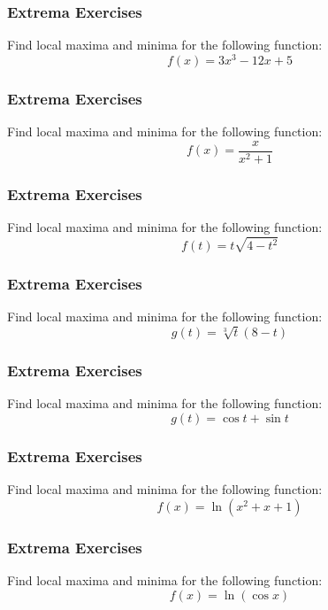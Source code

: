\documentclass[xcolor=dvipsnames]{beamer}
\begin{document}
\begin{frame}
  \frametitle{Extrema Exercises}
{\ubung} Find local maxima and minima for the following function:
\begin{equation}
  \label{eq:xxyxx1}
f(x)=3x^{3}-12x+5
\end{equation}
\end{frame}

\begin{frame}
  \frametitle{Extrema Exercises}
{\ubung} Find local maxima and minima for the following function:
\begin{equation}
  \label{eq:xxyxx2}
f(x)=\frac{x}{x^{2}+1}
\end{equation}
\end{frame}

\begin{frame}
  \frametitle{Extrema Exercises}
{\ubung} Find local maxima and minima for the following function:
\begin{equation}
  \label{eq:xxyxx3}
f(t)=t\sqrt{4-t^{2}}
\end{equation}
\end{frame}

\begin{frame}
  \frametitle{Extrema Exercises}
{\ubung} Find local maxima and minima for the following function:
\begin{equation}
  \label{eq:xxyxx4}
g(t)=\sqrt[3]{t}(8-t)
\end{equation}
\end{frame}

\begin{frame}
  \frametitle{Extrema Exercises}
{\ubung} Find local maxima and minima for the following function:
\begin{equation}
  \label{eq:xxyxx5}
g(t)=\cos{}t+\sin{}t
\end{equation}
\end{frame}

\begin{frame}
  \frametitle{Extrema Exercises}
{\ubung} Find local maxima and minima for the following function:
\begin{equation}
  \label{eq:xxyxx6}
f(x)=\ln(x^{2}+x+1)
\end{equation}
\end{frame}

\begin{frame}
  \frametitle{Extrema Exercises}
{\ubung} Find local maxima and minima for the following function:
\begin{equation}
  \label{eq:xxyxx7}
f(x)=\ln\left(\cos{}x\right)
\end{equation}
\end{frame}
\end{document}
